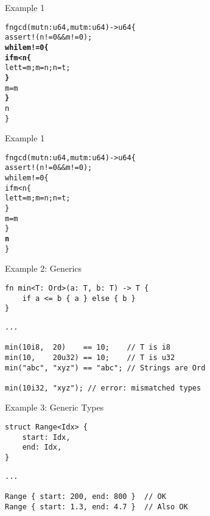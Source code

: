 \documentclass[aspectratio=1610,t]{beamer}
\newcommand\hi[1]{{\color{mainorange} \textbf{#1}}}
\begin{document}

\begin{frame}[fragile]{Example 1}
\begin{alltt}
fn gcd(mut n: u64, mut m: u64) -> u64 \{
    assert!(n != 0 && m != 0);
    \hi{while m != 0 \{}
        \hi{if m < n \{}
            let t = m; m = n; n = t;
        \hi{\}}
        m = m % n;
    \hi{\}}
    n
\}
\end{alltt}
\end{frame}


\begin{frame}[fragile]{Example 1}
\begin{alltt}
fn gcd(mut n: u64, mut m: u64) -> u64 \{
    assert!(n != 0 && m != 0);
    while m != 0 \{
        if m < n \{
            let t = m; m = n; n = t;
        \}
        m = m % n;
    \}
    \hi{n}
\}
\end{alltt}
\end{frame}


\begin{frame}[fragile]{Example 2: Generics}

\begin{verbatim}
fn min<T: Ord>(a: T, b: T) -> T {
    if a <= b { a } else { b }
}
\end{verbatim}
\pause
\begin{verbatim}
...

min(10i8,  20)    == 10;    // T is i8
min(10,    20u32) == 10;    // T is u32
min("abc", "xyz") == "abc"; // Strings are Ord

min(10i32, "xyz"); // error: mismatched types
\end{verbatim}

\end{frame}


\begin{frame}[fragile]{Example 3: Generic Types}
\begin{verbatim}
struct Range<Idx> {
    start: Idx,
    end: Idx,
}
\end{verbatim}
\pause
\begin{verbatim}
...

Range { start: 200, end: 800 }  // OK
Range { start: 1.3, end: 4.7 }  // Also OK
\end{verbatim}
\end{frame}

\end{document}
